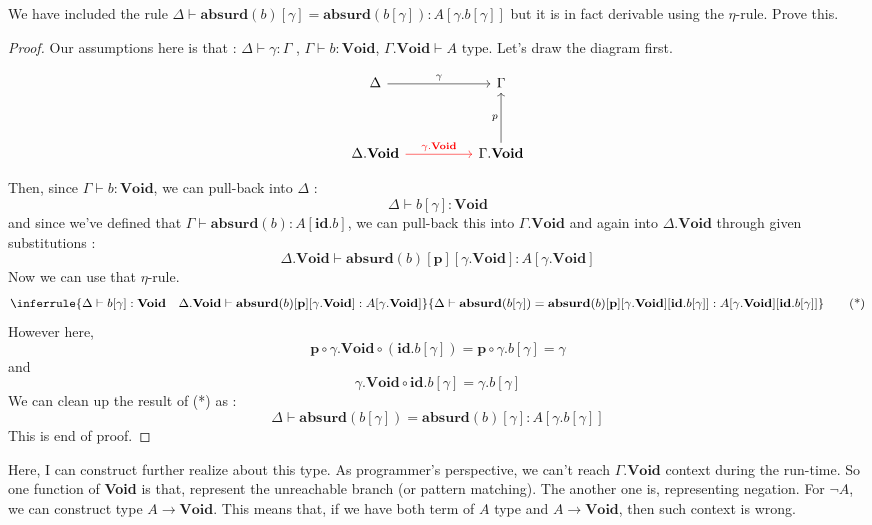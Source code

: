 \documentclass[12pt, a4paper, openany, twoside]{book}
\theoremstyle{definition}
\theoremstyle{remark}
\theoremstyle{plain}
\numberwithin{equation}{section}
\begin{document}
\begin{tcolorbox}[breakable, colback=yellow!10!white,colframe=brown!75!black,title=Exercise 3.2.9.]\hypertarget{const 3.2.9.}{}
We have included the rule $\Delta \vdash \mathbf{absurd}(b)[\gamma] = \mathbf{absurd}(b[\gamma]) : A[\gamma.b[\gamma]]$ but 
it is in fact derivable using the $\eta$-rule. Prove this. 

\begin{proof}
Our assumptions here is that : $\Delta \vdash \gamma : \Gamma$ , $\Gamma \vdash b : \mathbf{Void}$, $\Gamma.\mathbf{Void} \vdash A \text{ type}$.
Let's draw the diagram first. 

\[\begin{tikzcd}[row sep = huge, column sep = huge]
    \Delta  \arrow[r, "\gamma"] & \Gamma   \\
    \Delta.\mathbf{Void} \arrow[r, red, "\gamma.\mathbf{Void}"] & \Gamma.\mathbf{Void} \arrow[u, "p"]
\end{tikzcd}\]

Then, since $\Gamma \vdash b : \mathbf{Void}$, we can pull-back into $\Delta$ : 
\[\Delta \vdash b[\gamma] : \mathbf{Void}\]
and since we've defined that $\Gamma \vdash \mathbf{absurd}(b) : A[\mathbf{id}.b]$, we can pull-back this into $\Gamma.\mathbf{Void}$ and again into $\Delta.\mathbf{Void}$ 
through given substitutions : 
\[
\Delta.\mathbf{Void} \vdash \mathbf{absurd}(b)[\mathbf{p}][\gamma.\mathbf{Void}] : A[\gamma.\mathbf{Void}]
\]
Now we can use that $\eta$-rule. 
\[
\inferrule
{
    \Delta \vdash b[\gamma] : \mathbf{Void} \quad \Delta.\mathbf{Void} \vdash \mathbf{absurd}(b)[\mathbf{p}][\gamma.\mathbf{Void}] : A[\gamma.\mathbf{Void}]
}
{
    \Delta \vdash \mathbf{absurd}(b[\gamma]) = \mathbf{absurd}(b)[\mathbf{p}][\gamma.\mathbf{Void}][\mathbf{id}.b[\gamma]] : A[\gamma.\mathbf{Void}][\mathbf{id}.b[\gamma]]
}
\tag{*}
\]
However here, 
\[\mathbf{p} \circ \gamma.\mathbf{Void} \circ (\mathbf{id}.b[\gamma]) = \mathbf{p} \circ \gamma.b[\gamma] = \gamma\]
and 
\[\gamma.\mathbf{Void} \circ \mathbf{id}.b[\gamma] = \gamma.b[\gamma] \]
We can clean up the result of (*) as : 
\[\Delta \vdash \mathbf{absurd}(b[\gamma]) = \mathbf{absurd}(b)[\gamma] : A[\gamma.b[\gamma]]\]
This is end of proof. 
\end{proof}
\end{tcolorbox}

Here, I can construct further realize about this type. As programmer's perspective, 
we can't reach $\Gamma.\mathbf{Void}$ context during the run-time. So one function of \textbf{Void} is that, 
represent the unreachable branch (or pattern matching). The another one is, representing negation. 
For $\neg A$, we can construct type $A \rightarrow \mathbf{Void}$. This means that, 
if we have both term of $A$ type and $A \rightarrow \mathbf{Void}$, then such context is wrong. 
\end{document}
